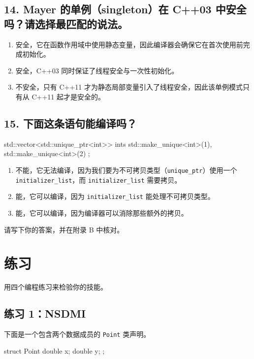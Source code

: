 \subsection{14. Mayer 的单例（singleton）在 C++03 中安全吗？请选择最匹配的说法。}

\begin{enumerate}
\item 安全，它在函数作用域中使用静态变量，因此编译器会确保它在首次使用前完成初始化。
\item 安全，C++03 同时保证了线程安全与一次性初始化。
\item 不安全，只有 C++11 才为静态局部变量引入了线程安全，因此该单例模式只有从 C++11 起才是安全的。
\end{enumerate}

\subsection{15. 下面这条语句能编译吗？}

\begin{codebox}[cpp]
std::vector<std::unique_ptr<int>> ints {
std::make_unique<int>(1), std::make_unique<int>(2)
};
\end{codebox}

\begin{enumerate}
\item 不能，它无法编译，因为我们要为不可拷贝类型（\texttt{unique\_ptr}）使用一个 \texttt{initializer\_list}，而 \texttt{initializer\_list} 需要拷贝。
\item 能，它可以编译，因为 \texttt{initializer\_list} 能处理不可拷贝类型。
\item 能，它可以编译，因为编译器可以消除那些额外的拷贝。
\end{enumerate}

请写下你的答案，并在附录 B 中核对。

\section{练习}

用四个编程练习来检验你的技能。

\subsection{练习 1：NSDMI}

下面是一个包含两个数据成员的 \texttt{Point} 类声明。

\begin{codebox}[cpp]
struct Point {
double x;
double y;
};
\end{codebox}

